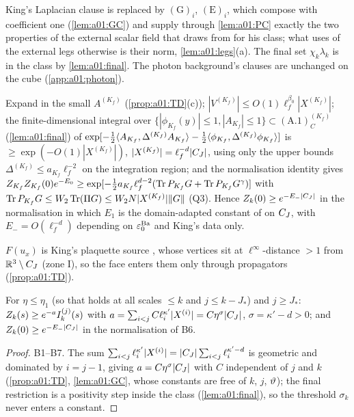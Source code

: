 \begin{description}[leftmargin=1.5em,style=nextline]
\item[{B5 (King's Appendix: \cite[(3.2)]{K1} in place of \cite[(3.27)--(3.29)]{Ba1})}] King's Laplacian clause is replaced by $(\mathrm G)_i$, $(\mathrm E)_i$, which compose with coefficient one (\cref{lem:a01:GC}) and supply through \cref{lem:a01:PC} exactly the two properties of the external scalar field that \cite[p.~421]{Ba3} draws from \cite[Lemma~2.4]{Ba2} for his class; what \cite[Prop.~1]{Ba3} uses of the external legs otherwise is their norm, \cref{lem:a01:legs}(a). The final set $\chi_k\lambda_k$ is in the class by \cref{lem:a01:final}. The photon background's clauses \cite[(A.2)--(A.6)]{K1} are unchanged on the cube (\cref{app:a01:photon}).
\item[{B6 (the final step at $\ell_f=\ell_{K_f}$; \cite[(3.66)--(3.69)]{Ba1})}] Expand in the small $A^{(K_f)}$ (\cref{prop:a01:TD}(c)); $|V^{(K_f)}|\le O(1)\ell_f^{\beta_0}|X^{(K_f)}|$; the finite-dimensional integral over $\{|\phi_{K_f}(y)|\le1,|A_{K_f}|\le1\}\subset(\mathrm{A.1})^{(K_f)}_C$ (\cref{lem:a01:final}) of $\exp[-\frac12\langle A_{K_f},\Delta^{(K_f)}A_{K_f}\rangle-\frac12\langle \phi_{K_f},\Delta^{(K_f)}\phi_{K_f}\rangle]$ is $\ge\exp(-O(1)|X^{(K_f)}|)$, $|X^{(K_f)}|=\ell_f^{-d}|C_J|$, using only the upper bounds $\Delta^{(K_f)}\le a_{K_f}\ell_f^{-2}$ on the integration region; and the normalisation identity \cite[(3.69)]{Ba1} gives $Z_{K_f}Z_{K_f}(0)e^{-E_0}\ge\exp[-\frac12a_{K_f}\ell_f^{d-2}(\operatorname{Tr} P_{K_f}G+\operatorname{Tr} P_{K_f}G^\gamma)]$ with $\operatorname{Tr} P_{K_f}G\le W_2\operatorname{Tr}(\Pi G)\le W_2N|X^{(K_f)}|\lVert G\rVert$ (Q3). Hence $Z_{k}(0)\ge e^{-E_-|C_J|}$ in the normalisation in which $E_1$ is the domain-adapted constant of \cite[(3.35)]{K1} on $C_J$, with $E_-=O(\ell_f^{-d})$ depending on $\varepsilon_0^{\mathrm{Ba}}$ and King's data only.
\item[B7 (the source)] $F(u_x)$ is King's plaquette source \cite[(2.7)]{K1}, whose vertices \cite[(3.20)]{K1} sit at $\ell^\infty$-distance $>1$ from $\mathbb R^3\setminus C_J$ (zone I), so the face enters them only through propagators (\cref{prop:a01:TD}).
\end{description}

\begin{proposition}\label{prop:a01:lower}
For $\eta\le\eta_1$ (so that \cite[(3.54)]{Ba1} holds at all scales $\le k$ and $j\le k-J_*$) and $j\ge J_*$: $Z_{k}(s)\ge e^{-a}I^{(j)}_{k}(s)$ with $a=\sum_{i<j}C\ell_i^{\kappa'}|X^{(i)}|=C\eta^\sigma|C_J|$, $\sigma=\kappa'-d>0$; and $Z_{k}(0)\ge e^{-E_-|C_J|}$ in the normalisation of B6.
\end{proposition}
\begin{proof}
B1--B7. The sum $\sum_{i<j}\ell_i^{\kappa'}|X^{(i)}|=|C_J|\sum_{i<j}\ell_i^{\kappa'-d}$ is geometric and dominated by $i=j-1$, giving $a=C\eta^\sigma|C_J|$ with $C$ independent of $j$ and $k$ (\cref{prop:a01:TD}, \cref{lem:a01:GC}, whose constants are free of $k$, $j$, $\vartheta$); the final restriction is a positivity step inside the class (\cref{lem:a01:final}), so the threshold $\sigma_k$ never enters a constant.
\end{proof}

